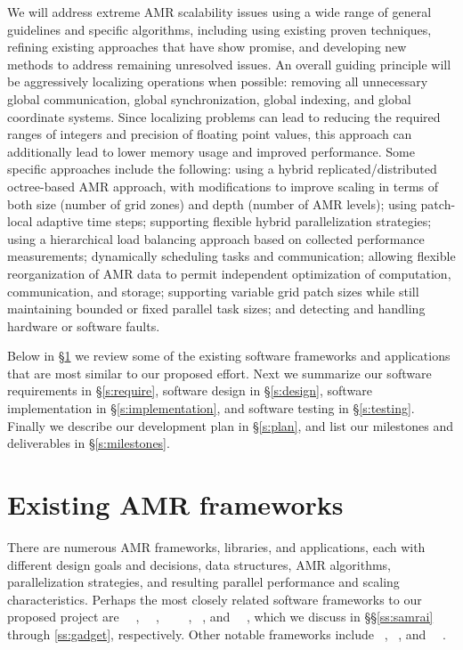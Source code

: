 \documentclass[10pt,twocolumn]{article}
\begin{document}
We will address extreme AMR scalability issues using a wide range of
general guidelines and specific algorithms, including using existing
proven techniques, refining existing approaches that have show
promise, and developing new methods to address remaining unresolved
issues.  An overall guiding principle will be aggressively localizing
operations when possible: removing all unnecessary global
communication, global synchronization, global indexing, and global
coordinate systems.  Since localizing problems can lead to reducing
the required ranges of integers and precision of floating point
values, this approach can additionally lead to lower memory usage and
improved performance.  Some specific approaches include the following:
using a hybrid replicated/distributed octree-based AMR approach, with
modifications to improve scaling in terms of both size (number of grid
zones) and depth (number of AMR levels); using patch-local adaptive
time steps; supporting flexible hybrid parallelization strategies;
using a hierarchical load balancing approach based on collected
performance measurements; dynamically scheduling tasks and
communication; allowing flexible reorganization of AMR data to permit
independent optimization of computation, communication, and storage;
supporting variable grid patch sizes while still maintaining bounded
or fixed parallel task sizes; and detecting and handling hardware or
software faults.

Below in \S\ref{s:review} we review some of the existing software
frameworks and applications that are most similar to our proposed
effort.  Next we summarize our software requirements in
\S\ref{s:require}, software design in \S\ref{s:design}, software
implementation in \S\ref{s:implementation}, and software testing in
\S\ref{s:testing}.  Finally we describe our development plan in
\S\ref{s:plan}, and list our milestones and deliverables in
\S\ref{s:milestones}.

\section{Existing AMR frameworks} \label{s:review}

There are numerous AMR frameworks, libraries, and applications, each
with different design goals and decisions, data structures, AMR
algorithms, parallelization strategies, and resulting parallel
performance and scaling characteristics.  Perhaps the most closely
related software frameworks to our proposed project are
\samrai~\cite{WiHo01}~\cite{wwwsamraicode},
\chombo~\cite{wwwchombo}~\cite{CoGr09},
\paramesh~\cite{MaOl00}~\cite{OlMa05}~\cite{Ol06}~\cite{wwwparamesh},
\alps~\cite{BuBu09}, and \gadget~\cite{wwwgadget}~\cite{Sp05}, which
we discuss in \S\S\ref{ss:samrai} through \ref{ss:gadget},
respectively.  Other notable frameworks include
\clawpack~\cite{wwwclawpack}, \grace~\cite{PaLi10}, and
\carpet~\cite{ScDi06}~\cite{wwwcarpet}.
\end{document}
